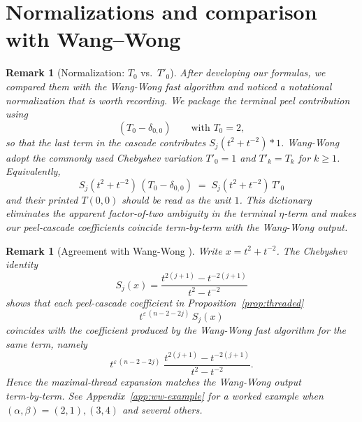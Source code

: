 \documentclass[12pt]{article}
\newtheorem{remark}[theorem]{Remark}
\begin{document}



















\section{Normalizations and comparison with Wang--Wong}\label{app:norm-ww}
\begin{remark}[Normalization: \(T_0\) vs.\ \(T'_0\)]
After developing our formulas, we compared them with the Wang-Wong fast algorithm \cite[p.9]{wangwong} and noticed a notational normalization that is worth recording. We package the terminal peel contribution using
\[
(T_0 - \delta_{0,0})\qquad\text{with }T_0=2,
\]
so that the last term in the cascade contributes \(S_j(t^2+t^{-2})\ast 1\).
Wang-Wong adopt the commonly used Chebyshev variation \(T'_0=1\) and \(T'_k=T_k\) for \(k\ge 1\). Equivalently,
\[
S_j(t^2+t^{-2})\,(T_0-\delta_{0,0}) \;=\; S_j(t^2+t^{-2})\,T'_0
\]
and their printed \(T(0,0)\) should be read as the unit \(1\).
This dictionary eliminates the apparent factor‑of‑two ambiguity in the terminal \(\eta\)-term and makes our peel‑cascade coefficients coincide term‑by‑term with the Wang-Wong output.
\end{remark}


\begin{remark}[Agreement with Wang-Wong \cite{wangwong}]
Write $x=t^{2}+t^{-2}$. The Chebyshev identity
\[
S_j(x)=\frac{t^{2(j+1)}-t^{-2(j+1)}}{t^{2}-t^{-2}}
\]
shows that each peel-cascade coefficient in Proposition~\ref{prop:threaded}
\[
t^{\varepsilon\,(n-2-2j)}\,S_j(x)
\]
coincides with the coefficient produced by the Wang-Wong fast algorithm for the same term, namely
\[
t^{\varepsilon\,(n-2-2j)}\;\frac{t^{2(j+1)}-t^{-2(j+1)}}{t^{2}-t^{-2}}.
\]
Hence the maximal‑thread expansion matches the Wang-Wong output term‑by‑term. See Appendix~\ref{app:ww-example} for a worked example when $(\alpha,\beta)=(2,1),(3,4)$ and several others.
\end{remark}
\end{document}
